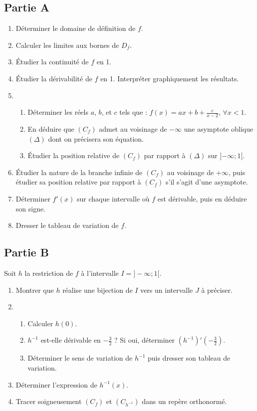 \documentclass[12pt]{article}
\begin{document}
\subsection*{Partie A}

\begin{enumerate}
    \item Déterminer le domaine de définition de $f$.
    \item Calculer les limites aux bornes de $D_f$.
    \item Étudier la continuité de $f$ en 1.
    \item Étudier la dérivabilité de $f$ en 1. Interpréter graphiquement les résultats.
    \item 
    \begin{enumerate}
        \item Déterminer les réels $a$, $b$, et $c$ tels que : $f(x) = ax + b + \frac{c}{x-2}$, $\forall x < 1$.
        \item En déduire que $(C_f)$ admet au voisinage de $-\infty$ une asymptote oblique $(\Delta)$ dont on précisera son équation.
        \item Étudier la position relative de $(C_f)$ par rapport à $(\Delta)$ sur ]$-\infty ; 1[$.
    \end{enumerate}
    \item Étudier la nature de la branche infinie de $(C_f)$ au voisinage de $+\infty$, puis étudier sa position relative par rapport à $(C_f)$ s'il s'agit d'une asymptote.
    \item Déterminer $f'(x)$ sur chaque intervalle où $f$ est dérivable, puis en déduire son signe.
    \item Dresser le tableau de variation de $f$.
\end{enumerate}

\subsection*{Partie B}


Soit $h$ la restriction de $f$ à l’intervalle $I = ]-\infty; 1[$.
\begin{enumerate}
    \item Montrer que $h$ réalise une bijection de $I$ vers un intervalle $J$ à préciser.
    \item 
    \begin{enumerate}
        \item Calculer $h(0)$.
        \item $h^{-1}$ est-elle dérivable en $-\frac{3}{2}$ ? Si oui, déterminer $(h^{-1})'\left(-\frac{3}{2}\right)$.
        \item Déterminer le sens de variation de $h^{-1}$ puis dresser son tableau de variation.
    \end{enumerate}
    \item Déterminer l’expression de $h^{-1}(x)$.
    \item Tracer soigneusement $(C_f)$ et $(C_{h^{-1}})$ dans un repère orthonormé.
\end{enumerate}
\end{document}
